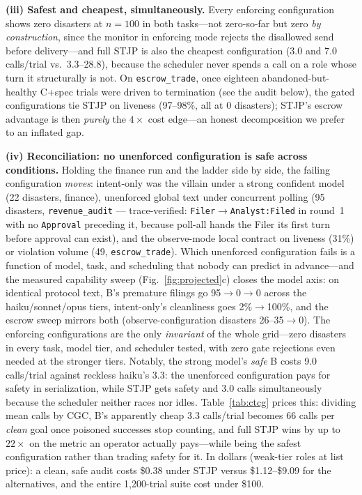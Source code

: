 \documentclass{article}
\newcommand{\stjp}{\textsc{STJP}}
\begin{document}
\textbf{(iii) Safest and cheapest, simultaneously.} Every enforcing configuration shows zero disasters at $n{=}100$ in both tasks---not zero-so-far but zero \emph{by construction}, since the monitor in enforcing mode rejects the disallowed send before delivery---and full \stjp{} is also the cheapest configuration (3.0 and 7.0 calls/trial vs.\ 3.3--28.8), because the scheduler never spends a call on a role whose turn it structurally is not. On \texttt{escrow\_trade}, once eighteen abandoned-but-healthy C+spec trials were driven to termination (see the audit below), the gated configurations tie \stjp{} on liveness (97--98\%, all at 0 disasters); \stjp{}'s escrow advantage is then \emph{purely} the $4\times$ cost edge---an honest decomposition we prefer to an inflated gap.

\textbf{(iv) Reconciliation: no unenforced configuration is safe across conditions.} Holding the finance run and the ladder side by side, the failing configuration \emph{moves}: intent-only was the villain under a strong confident model (22 disasters, finance), unenforced global text under concurrent polling (95 disasters, \texttt{revenue\_audit} --- trace-verified: \texttt{Filer$\to$Analyst:Filed} in round~1 with no \texttt{Approval} preceding it, because poll-all hands the Filer its first turn before approval can exist), and the observe-mode local contract on liveness (31\%) or violation volume (49, \texttt{escrow\_trade}). Which unenforced configuration fails is a function of model, task, and scheduling that nobody can predict in advance---and the measured capability sweep (Fig.~\ref{fig:projected}c) closes the model axis: on identical protocol text, B's premature filings go 95$\to$0$\to$0 across the haiku/sonnet/opus tiers, intent-only's cleanliness goes 2\%$\to$100\%, and the escrow sweep mirrors both (observe-configuration disasters 26--35$\to$0). The enforcing configurations are the only \emph{invariant} of the whole grid---zero disasters in every task, model tier, and scheduler tested, with zero gate rejections even needed at the stronger tiers. Notably, the strong model's \emph{safe} B costs 9.0 calls/trial against reckless haiku's 3.3: the unenforced configuration pays for safety in serialization, while \stjp{} gets safety and 3.0 calls simultaneously because the scheduler neither races nor idles. Table~\ref{tab:ctcg} prices this: dividing mean calls by CGC, B's apparently cheap 3.3 calls/trial becomes 66 calls per \emph{clean} goal once poisoned successes stop counting, and full \stjp{} wins by up to $22\times$ on the metric an operator actually pays---while being the safest configuration rather than trading safety for it. In dollars (weak-tier roles at list price): a clean, safe audit costs \$0.38 under \stjp{} versus \$1.12--\$9.09 for the alternatives, and the entire 1{,}200-trial suite cost under \$100.
\end{document}
